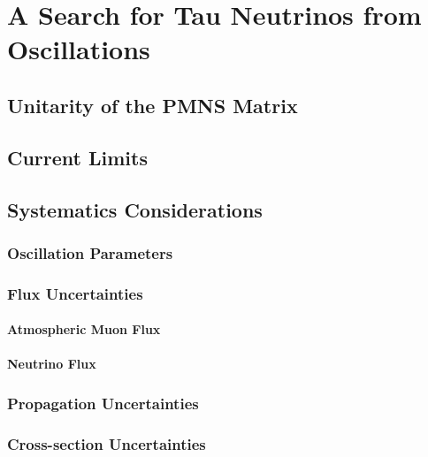 \chapter{A Search for Tau Neutrinos from Oscillations}

\label{sec:unitarity}
\section{Unitarity of the PMNS Matrix}

\label{sec:current_limits}
\section{Current Limits}

\label{sec:systematics}
\section{Systematics Considerations}

\label{subsec:oscillation_params}
\subsection{Oscillation Parameters}

\label{subsec:flux_systematics}
\subsection{Flux Uncertainties}

\label{subsubsec:muon_systematics}
\subsubsection{Atmospheric Muon Flux}

\label{subsubsec:neutrino_flux}
\subsubsection{Neutrino Flux}

\label{subsec:propagation_systematics}
\subsection{Propagation Uncertainties}

\label{subsec:xsec_systematics}
\subsection{Cross-section Uncertainties}

